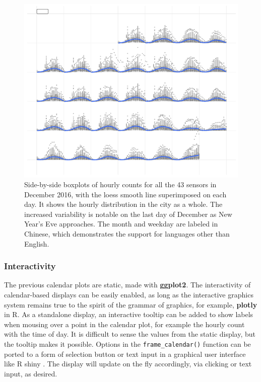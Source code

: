 \documentclass[12pt]{article}
\begin{document}
\begin{figure}

{\centering \includegraphics[width=\textwidth]{figure/chn-1} 

}

\caption{Side-by-side boxplots of hourly counts for all the 43 sensors in December 2016, with the loess smooth line superimposed on each day. It shows the hourly distribution in the city as a whole. The increased variability is notable on the last day of December as New Year's Eve approaches. The month and weekday are labeled in Chinese, which demonstrates the support for languages other than English.}\label{fig:chn}
\end{figure}



\hypertarget{interactivity}{%
\subsubsection{Interactivity}\label{interactivity}}

The previous calendar plots are static, made with \textbf{ggplot2}. The interactivity of calendar-based displays can be easily enabled, as long as the interactive graphics system remains true to the spirit of the grammar of graphics, for example, \textbf{plotly} \citep{plotly} in R. As a standalone display, an interactive tooltip can be added to show labels when mousing over a point in the calendar plot, for example the hourly count with the time of day. It is difficult to sense the values from the static display, but the tooltip makes it possible. Options in the \texttt{frame\_calendar()} function can be ported to a form of selection button or text input in a graphical user interface like R shiny \citep{R-shiny}. The display will update on the fly accordingly, via clicking or text input, as desired.
\end{document}
